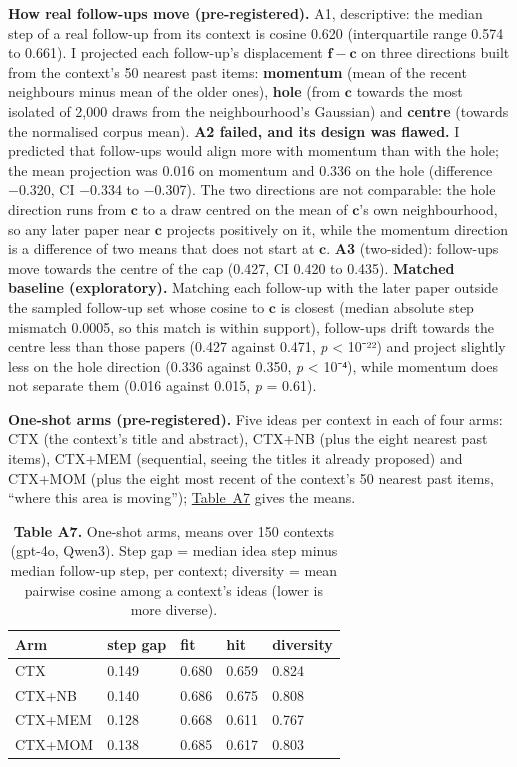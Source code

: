 \documentclass[
  10pt,
]{article}
\begin{document}
\textbf{How real follow-ups move
(pre-registered).} A1, descriptive: the
median step of a real follow-up from its
context is cosine 0.620 (interquartile
range 0.574 to 0.661). I projected each
follow-up's displacement
\(\mathbf{f} - \mathbf{c}\) on three
directions built from the context's 50
nearest past items: \textbf{momentum}
(mean of the recent neighbours minus
mean of the older ones), \textbf{hole}
(from \(\mathbf{c}\) towards the most
isolated of 2,000 draws from the
neighbourhood's Gaussian) and
\textbf{centre} (towards the normalised
corpus mean). \textbf{A2 failed, and its
design was flawed.} I predicted that
follow-ups would align more with
momentum than with the hole; the mean
projection was 0.016 on momentum and
0.336 on the hole (difference −0.320, CI
−0.334 to −0.307). The two directions
are not comparable: the hole direction
runs from \(\mathbf{c}\) to a draw
centred on the mean of \(\mathbf{c}\)'s
own neighbourhood, so any later paper
near \(\mathbf{c}\) projects positively
on it, while the momentum direction is a
difference of two means that does not
start at \(\mathbf{c}\). \textbf{A3}
(two-sided): follow-ups move towards the
centre of the cap (0.427, CI 0.420 to
0.435). \textbf{Matched baseline
(exploratory).} Matching each follow-up
with the later paper outside the sampled
follow-up set whose cosine to
\(\mathbf{c}\) is closest (median
absolute step mismatch 0.0005, so this
match is within support), follow-ups
drift towards the centre less than those
papers (0.427 against 0.471, \emph{p}
\textless{} 10⁻²²) and project slightly
less on the hole direction (0.336
against 0.350, \emph{p} \textless{}
10⁻⁴), while momentum does not separate
them (0.016 against 0.015, \emph{p} =
0.61).

\textbf{One-shot arms (pre-registered).}
Five ideas per context in each of four
arms: CTX (the context's title and
abstract), CTX+NB (plus the eight
nearest past items), CTX+MEM
(sequential, seeing the titles it
already proposed) and CTX+MOM (plus the
eight most recent of the context's 50
nearest past items, ``where this area is
moving''); \hyperref[tab:A7]{Table~A7}
gives the means.

\begin{table}[tbp]
\centering\footnotesize\setlength{\tabcolsep}{4pt}
\caption[]{\textbf{Table A7.} One-shot arms, means over 150 contexts (gpt-4o, Qwen3). Step gap = median idea step minus median follow-up step, per context; diversity = mean pairwise cosine among a context's ideas (lower is more diverse).}\label{tab:A7}
\begin{tabular}{@{}lllll@{}}
\toprule
Arm & step gap & fit & hit & diversity \\
\midrule
CTX & 0.149 & 0.680 & 0.659 & 0.824 \\
CTX+NB & 0.140 & 0.686 & 0.675 & 0.808 \\
CTX+MEM & 0.128 & 0.668 & 0.611 & 0.767 \\
CTX+MOM & 0.138 & 0.685 & 0.617 & 0.803 \\
\bottomrule
\end{tabular}
\end{table}
\end{document}
